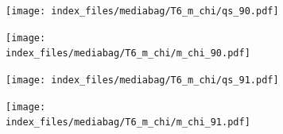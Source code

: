 \documentclass[
  11pt,
  letterpaper,
]{scrreprt}
\begin{document}
\begin{figure}

\begin{minipage}{0.50\linewidth}

\begin{figure}[H]

{\centering \texttt{[image: index\_files/mediabag/T6\_m\_chi/qs\_90.pdf]}

}


\end{figure}%

\end{minipage}%
%
\begin{minipage}{0.50\linewidth}

\begin{figure}[H]

{\centering \texttt{[image: index\_files/mediabag/T6\_m\_chi/m\_chi\_90.pdf]}

}


\end{figure}%

\end{minipage}%

\end{figure}%

\begin{figure}

\begin{minipage}{0.50\linewidth}

\begin{figure}[H]

{\centering \texttt{[image: index\_files/mediabag/T6\_m\_chi/qs\_91.pdf]}

}


\end{figure}%

\end{minipage}%
%
\begin{minipage}{0.50\linewidth}

\begin{figure}[H]

{\centering \texttt{[image: index\_files/mediabag/T6\_m\_chi/m\_chi\_91.pdf]}

}


\end{figure}%

\end{minipage}%

\end{figure}%
\end{document}
